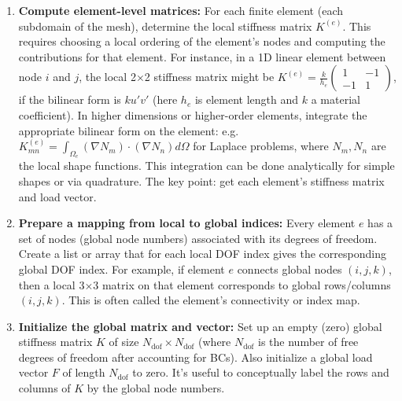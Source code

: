 \documentclass[a4paper,11pt]{article}
\begin{document}
\begin{enumerate}
    \item \textbf{Compute element-level matrices:} For each finite element (each subdomain of the mesh), determine the local stiffness matrix $K^{(e)}$. This requires choosing a local ordering of the element's nodes and computing the contributions for that element. For instance, in a 1D linear element between node $i$ and $j$, the local 2×2 stiffness matrix might be $K^{(e)} = \frac{k}{h_e} \begin{pmatrix} 1 & -1 \\ -1 & 1 \end{pmatrix}$, if the bilinear form is $k u'v'$ (here $h_e$ is element length and $k$ a material coefficient). In higher dimensions or higher-order elements, integrate the appropriate bilinear form on the element: e.g. $K^{(e)}_{mn} = \int_{\Omega_e} (\nabla N_m)\cdot(\nabla N_n) d\Omega$ for Laplace problems, where $N_m, N_n$ are the local shape functions. This integration can be done analytically for simple shapes or via quadrature. The key point: get each element's stiffness matrix and load vector.

    \item \textbf{Prepare a mapping from local to global indices:} Every element $e$ has a set of nodes (global node numbers) associated with its degrees of freedom. Create a list or array that for each local DOF index gives the corresponding global DOF index. For example, if element $e$ connects global nodes $(i, j, k)$, then a local 3×3 matrix on that element corresponds to global rows/columns $(i, j, k)$. This is often called the element's connectivity or index map.

    \item \textbf{Initialize the global matrix and vector:} Set up an empty (zero) global stiffness matrix $K$ of size $N_{\text{dof}} \times N_{\text{dof}}$ (where $N_{\text{dof}}$ is the number of free degrees of freedom after accounting for BCs). Also initialize a global load vector $F$ of length $N_{\text{dof}}$ to zero. It's useful to conceptually label the rows and columns of $K$ by the global node numbers.


\end{enumerate}
\end{document}
